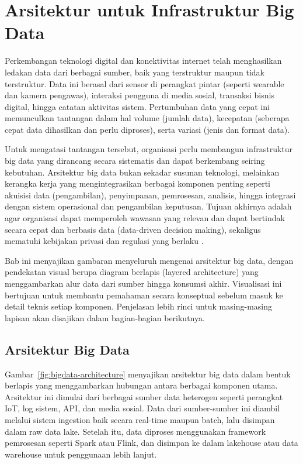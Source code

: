 \chapter{Arsitektur untuk Infrastruktur Big Data}

\noindent
Perkembangan teknologi digital dan konektivitas internet telah menghasilkan ledakan data dari berbagai sumber, baik yang terstruktur maupun tidak terstruktur. Data ini berasal dari sensor di perangkat pintar (seperti wearable dan kamera pengawas), interaksi pengguna di media sosial, transaksi bisnis digital, hingga catatan aktivitas sistem. Pertumbuhan data yang cepat ini memunculkan tantangan dalam hal volume (jumlah data), kecepatan (seberapa cepat data dihasilkan dan perlu diproses), serta variasi (jenis dan format data).

Untuk mengatasi tantangan tersebut, organisasi perlu membangun infrastruktur big data yang dirancang secara sistematis dan dapat berkembang seiring kebutuhan. Arsitektur big data bukan sekadar susunan teknologi, melainkan kerangka kerja yang mengintegrasikan berbagai komponen penting seperti akuisisi data (pengambilan), penyimpanan, pemrosesan, analisis, hingga integrasi dengan sistem operasional dan pengambilan keputusan. Tujuan akhirnya adalah agar organisasi dapat memperoleh wawasan yang relevan dan dapat bertindak secara cepat dan berbasis data (data-driven decision making), sekaligus mematuhi kebijakan privasi dan regulasi yang berlaku \cite{marz2015bigdata, kiran2015bigdata}.

Bab ini menyajikan gambaran menyeluruh mengenai arsitektur big data, dengan pendekatan visual berupa diagram berlapis (layered architecture) yang menggambarkan alur data dari sumber hingga konsumsi akhir. Visualisasi ini bertujuan untuk membantu pemahaman secara konseptual sebelum masuk ke detail teknis setiap komponen. Penjelasan lebih rinci untuk masing-masing lapisan akan disajikan dalam bagian-bagian berikutnya.

\section{Arsitektur Big Data}

Gambar~\ref{fig:bigdata-architecture} menyajikan arsitektur big data dalam bentuk berlapis yang menggambarkan hubungan antara berbagai komponen utama. Arsitektur ini dimulai dari berbagai sumber data heterogen seperti perangkat IoT, log sistem, API, dan media sosial. Data dari sumber-sumber ini diambil melalui sistem ingestion baik secara real-time maupun batch, lalu disimpan dalam raw data lake. Setelah itu, data diproses menggunakan framework pemrosesan seperti Spark atau Flink, dan disimpan ke dalam lakehouse atau data warehouse untuk penggunaan lebih lanjut.

